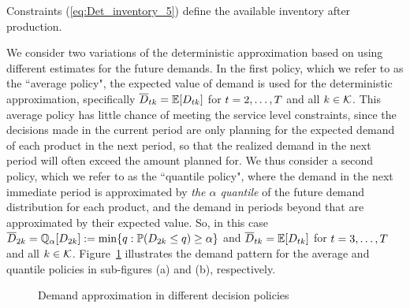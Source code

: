 \documentclass[msom]{oo}
\begin{document}
Constraints (\ref{eq:Det_inventory_5}) define the available inventory after production. %


We consider two variations of the deterministic approximation based on using different estimates for the future demands.
In the first policy, which we refer to as the ``average policy", the expected value of demand is used for the deterministic approximation, specifically $\overline{D}_{t k} = \mathbb{E}[D_{t k}]$ for $t=2,\ldots,T$ and all $k \in \mathcal{K}$. This average policy has little chance of meeting the service level constraints, since the decisions made in the current period are only planning for the expected demand of each product in the next period, so that the realized demand in the next period will often exceed the amount planned for.  We thus consider a second policy, which we refer to as the ``quantile policy", where the demand in the next immediate period is approximated by {\it the $\alpha$ quantile} of the future demand distribution for each product, and the demand in periods beyond that are approximated by their expected value. So, in this case $\overline{D}_{2 k} = \mathbb{Q}_{\alpha}[D_{2 k}] := \min\{q : \mathbb{P}(D_{2 k} \leq q) \geq \alpha\}$  and  $\overline{D}_{t k} = \mathbb{E}[D_{t k}]$ for $t=3,\ldots,T$ and all $k \in \mathcal{K}$. Figure~\ref{fig:DemandPolicy} illustrates the demand pattern for the average and quantile policies in sub-figures (a) and (b), respectively.
\begin{figure} [ht]
    \centering 
    \caption{Demand approximation in different decision policies}%
    \label{fig:DemandPolicy}%
\end{figure}
\end{document}
